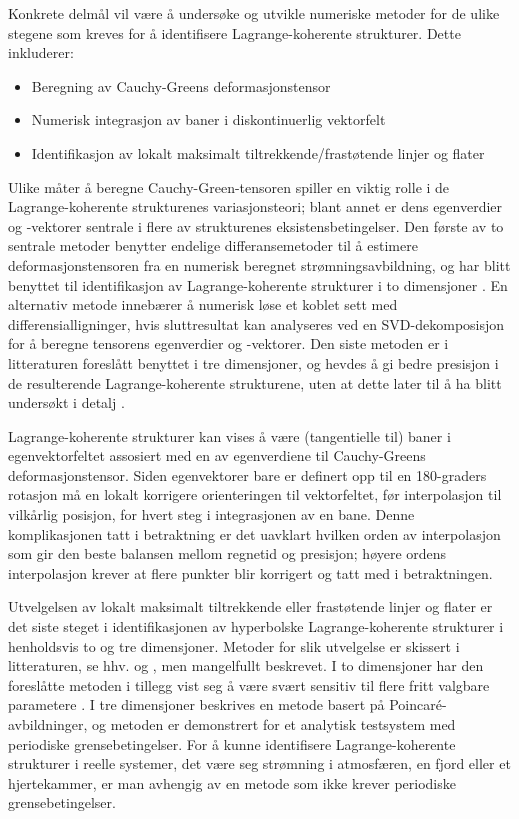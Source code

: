 Konkrete delmål vil være å undersøke og utvikle numeriske metoder for de ulike
stegene som kreves for å identifisere Lagrange-koherente strukturer. Dette
inkluderer:
\begin{itemize}[noitemsep]
    \item Beregning av Cauchy-Greens deformasjonstensor
    \item Numerisk integrasjon av baner i diskontinuerlig vektorfelt
    \item Identifikasjon av lokalt maksimalt tiltrekkende/frastøtende linjer og
        flater
\end{itemize}
Ulike måter å beregne Cauchy-Green-tensoren spiller en viktig rolle i de
Lagrange-koherente strukturenes variasjonsteori; blant annet er dens egenverdier
og -vektorer sentrale i flere av strukturenes eksistensbetingelser. Den første
av to sentrale metoder benytter endelige differansemetoder til å estimere
deformasjonstensoren fra en numerisk beregnet strømningsavbildning, og har blitt
benyttet til identifikasjon av Lagrange-koherente strukturer i to
dimensjoner \parencite{farazmand2012computing, loken2017}. En alternativ
metode innebærer å numerisk løse et koblet sett med differensialligninger, hvis
sluttresultat kan analyseres ved en SVD-dekomposisjon for å beregne tensorens
egenverdier og -vektorer. Den siste metoden er i litteraturen foreslått
benyttet i tre dimensjoner, og hevdes å gi bedre presisjon i de resulterende
Lagrange-koherente strukturene, uten at dette later til å ha blitt undersøkt
i detalj \parencite{oettinger2016autonomous}.

Lagrange-koherente strukturer kan vises å være (tangentielle til) baner i
egenvektorfeltet assosiert med en av egenverdiene til Cauchy-Greens
deformasjonstensor. Siden egenvektorer bare er definert opp til en 180-graders
rotasjon må en lokalt korrigere orienteringen til vektorfeltet, før
interpolasjon til vilkårlig posisjon, for hvert steg i integrasjonen av en bane.
Denne komplikasjonen tatt i betraktning er det uavklart hvilken orden av
interpolasjon som gir den beste balansen mellom regnetid og presisjon;
høyere ordens interpolasjon krever at flere punkter blir korrigert og tatt med
i betraktningen.

Utvelgelsen av lokalt maksimalt tiltrekkende eller frastøtende linjer og flater
er det siste steget i identifikasjonen av hyperbolske Lagrange-koherente
strukturer i henholdsvis to og tre dimensjoner. Metoder for slik utvelgelse er
skissert i litteraturen, se hhv. \textcite{farazmand2012computing} og
\parencite{oettinger2016autonomous}, men mangelfullt beskrevet. I to dimensjoner
har den foreslåtte metoden i tillegg vist seg å være svært sensitiv til flere
fritt valgbare parametere \parencite{loken2017}. I tre dimensjoner beskrives en
metode basert på Poincar\'{e}-avbildninger, og metoden er demonstrert for et
analytisk testsystem med periodiske grensebetingelser. For å kunne identifisere
Lagrange-koherente strukturer i reelle systemer, det være seg strømning i
atmosfæren, en fjord eller et hjertekammer, er man avhengig av en metode som
ikke krever periodiske grensebetingelser.

